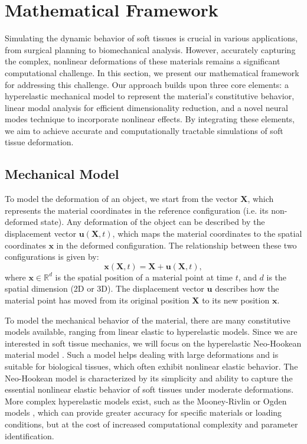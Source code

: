 \section{Mathematical Framework}
\label{sec:problem_setting}

Simulating the dynamic behavior of soft tissues is crucial in various applications, from surgical planning to biomechanical analysis. However, accurately capturing the complex, nonlinear deformations of these materials remains a significant computational challenge. In this section, we present our mathematical framework for addressing this challenge. Our approach builds upon three core elements: a hyperelastic mechanical model to represent the material's constitutive behavior, linear modal analysis for efficient dimensionality reduction, and a novel neural modes technique to incorporate nonlinear effects. By integrating these elements, we aim to achieve accurate and computationally tractable simulations of soft tissue deformation.


\subsection{Mechanical Model}
\label{sec:mechanical_model}

To model the deformation of an object, we start from the vector \(\bm{X}\), which represents the material coordinates in the reference configuration (i.e. its non-deformed state). Any deformation of the object can be described by the displacement vector \(\bm{u}(\bm{X},t)\), which maps the material coordinates to the spatial coordinates \(\bm{x}\) in the deformed configuration. The relationship between these two configurations is given by:
\begin{equation}
    \bm{x}(\bm{X},t) = \bm{X} + \bm{u}(\bm{X},t),
\label{eq:deformation}
\end{equation}
where \(\bm{x} \in \mathbb{R}^d\) is the spatial position of a material point at time \(t\), and \(d\) is the spatial dimension (2D or 3D). The displacement vector \(\bm{u}\) describes how the material point has moved from its original position \(\bm{X}\) to its new position \(\bm{x}\).

To model the mechanical behavior of the material, there are many constitutive models available, ranging from linear elastic to hyperelastic models. Since we are interested in soft tissue mechanics, we will focus on the hyperelastic Neo-Hookean material model \cite{Ogden_1997}. Such a model helps dealing with large deformations and is suitable for biological tissues, which often exhibit nonlinear elastic behavior. The Neo-Hookean model is characterized by its simplicity and ability to capture the essential nonlinear elastic behavior of soft tissues under moderate deformations. More complex hyperelastic models exist, such as the Mooney-Rivlin or Ogden models \cite{Ogden_1997}, which can provide greater accuracy for specific materials or loading conditions, but at the cost of increased computational complexity and parameter identification.

